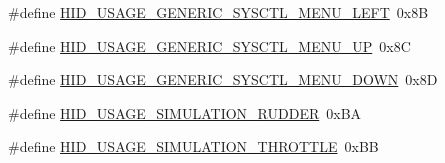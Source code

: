 \begin{DoxyCompactItemize}
\item 
\#define \hyperlink{group___u_s_b_d___h_i_d_gaa990f6e260ec95f96240ed8c4e36b05a}{H\+I\+D\+\_\+\+U\+S\+A\+G\+E\+\_\+\+G\+E\+N\+E\+R\+I\+C\+\_\+\+S\+Y\+S\+C\+T\+L\+\_\+\+M\+E\+N\+U\+\_\+\+L\+E\+FT}~0x8B
\item 
\#define \hyperlink{group___u_s_b_d___h_i_d_ga02512a2347c4327b90c53f9385804385}{H\+I\+D\+\_\+\+U\+S\+A\+G\+E\+\_\+\+G\+E\+N\+E\+R\+I\+C\+\_\+\+S\+Y\+S\+C\+T\+L\+\_\+\+M\+E\+N\+U\+\_\+\+UP}~0x8C
\item 
\#define \hyperlink{group___u_s_b_d___h_i_d_ga234727e438e810c8bf7d30a98c0ab2b0}{H\+I\+D\+\_\+\+U\+S\+A\+G\+E\+\_\+\+G\+E\+N\+E\+R\+I\+C\+\_\+\+S\+Y\+S\+C\+T\+L\+\_\+\+M\+E\+N\+U\+\_\+\+D\+O\+WN}~0x8D
\end{DoxyCompactItemize}
\begin{DoxyCompactItemize}
\item 
\#define \hyperlink{group___u_s_b_d___h_i_d_gab530d25dfff496c8f0ad9326f831ee44}{H\+I\+D\+\_\+\+U\+S\+A\+G\+E\+\_\+\+S\+I\+M\+U\+L\+A\+T\+I\+O\+N\+\_\+\+R\+U\+D\+D\+ER}~0x\+BA
\item 
\#define \hyperlink{group___u_s_b_d___h_i_d_ga65a1aadacf2b4f12a61f457786bdaf1c}{H\+I\+D\+\_\+\+U\+S\+A\+G\+E\+\_\+\+S\+I\+M\+U\+L\+A\+T\+I\+O\+N\+\_\+\+T\+H\+R\+O\+T\+T\+LE}~0x\+BB
\end{DoxyCompactItemize}
